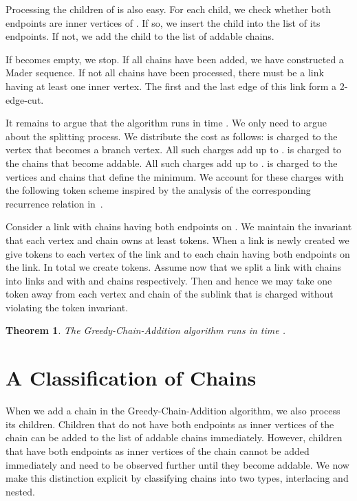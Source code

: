 \documentclass[paper=a4]{scrartcl}
\newtheorem{theorem}{Theorem}
\begin{document}
Processing the children of  is also easy. For each child, we check whether both endpoints are inner vertices of . If so, we insert the child into the list of its endpoints. If not, we add the child to the list of addable chains.


If \cL becomes empty, we stop. If all chains have been added, we have constructed a Mader sequence. If not all chains have been processed, there must be a link having at least one inner vertex. The first and the last edge of this link form a 2-edge-cut.

It remains to argue that the algorithm runs in time . We only need to argue about the splitting process. We distribute the cost  as follows:  is charged to the vertex that becomes a branch vertex. All such charges add up to .  is charged to the chains that become addable. All such charges add up to .  is charged to the vertices and chains that define the minimum. We account for these charges with the following token scheme inspired by the analysis of the corresponding recurrence relation in~\cite{Me3}.


Consider a link  with  chains having both endpoints on . We maintain the invariant that each vertex and chain owns at least  tokens. When a link is newly created we give  tokens to each vertex of the link and to each chain having both endpoints on the link. In total we create  tokens. Assume now that we split a link  with  chains into links  and  with  and  chains respectively. Then  and hence we may take one token away from each vertex and chain of the sublink that is charged without violating the token invariant.

\begin{theorem} The Greedy-Chain-Addition algorithm runs in time .
\end{theorem}

\section{A Classification of Chains}\label{A Classification of Chains}
When we add a chain in the Greedy-Chain-Addition algorithm, we also process its children. Children that do not have both endpoints as inner vertices of the chain can be added to the list of addable chains immediately. However, children that have both endpoints as inner vertices of the chain cannot be added immediately and need to be observed further until they become addable. We now make this distinction explicit by classifying chains into two types, interlacing and nested.
\end{document}
